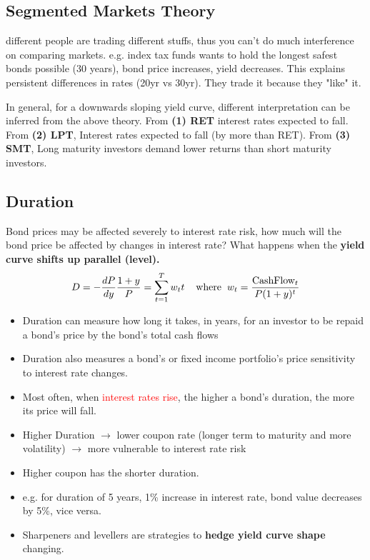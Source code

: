 \begin{multicols}{2}
\subsection{Segmented Markets Theory}
different people are trading different stuffs, thus you can't do much interference on comparing markets. e.g. index tax funds wants to hold the longest safest bonds possible (30 years), bond price increases, yield decreases. This explains persistent differences in rates (20yr vs 30yr). They trade it because they "like" it.\par

In general, for a downwards sloping yield curve, different interpretation can be inferred from the above theory. From \textbf{(1) RET} interest rates expected to fall. From \textbf{(2) LPT}, Interest rates expected to fall (by more than RET). From \textbf{(3) SMT}, Long maturity investors demand lower returns than short maturity investors.

\subsection{Duration}
Bond prices may be affected severely to interest rate risk, how much will the bond price be affected by changes in interest rate? What happens when the \textbf{yield curve shifts up parallel (level).}
\begin{gather*}
    D = -\frac{dP}{dy}\frac{1+y}{P} = \sum_{t=1}^{T}w_tt\hspace*{0.4cm}\text{where}\hspace*{0.2cm}w_t = \frac{\text{CashFlow}_t}{P(1+y)^t}
\end{gather*}
\begin{itemize}
    \item Duration can measure how long it takes, in years, for an investor to be repaid a bond's price by the bond's total cash flows
    \item Duration also measures a bond's or fixed income portfolio's price sensitivity to interest rate changes.
    \item Most often, when \textcolor{red}{interest rates rise}, the higher a bond's duration, the more its price will fall.
    \item Higher Duration $\rightarrow$ lower coupon rate (longer term to maturity and more volatility) $\rightarrow$ more vulnerable to interest rate risk
    \item Higher coupon has the shorter duration. 
    \item e.g. for duration of 5 years, 1\% increase in interest rate, bond value decreases by 5\%, vice versa.
    \item Sharpeners and levellers are strategies to \textbf{hedge yield curve shape} changing. 
\end{itemize}


\end{multicols}
